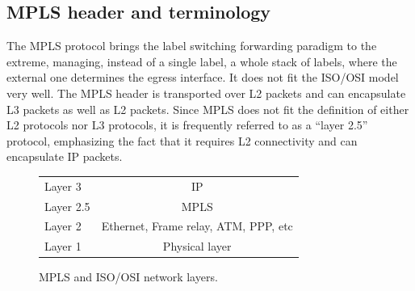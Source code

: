 \documentclass{article}
\begin{document}
% 

%
%
\subsection{MPLS header and terminology}

The MPLS protocol brings the label switching forwarding paradigm to the extreme,
managing, instead of a single label, a whole stack of labels, where the external one
determines the egress interface.
It does not fit the ISO/OSI model very well. The MPLS header is transported 
over L2 packets and can encapsulate L3 packets as well as L2 packets. 
Since MPLS does 
not fit the definition of either L2 protocols nor L3 protocols, it is frequently 
referred to as a ``layer 2.5'' protocol, emphasizing the fact that it requires 
L2 connectivity and can encapsulate IP packets.

\begin{figure}
 \centering
 \begin{tabular}{l |c|}
 \cline{2-2}
  Layer 3 & IP \\ \cline{2-2}
  Layer 2.5 & MPLS \\ \cline{2-2}
  Layer 2 & Ethernet, Frame relay, ATM, PPP, etc \\ \cline{2-2}
  Layer 1 & Physical layer \\ \cline{2-2}	
 \end{tabular}
 \caption{MPLS and ISO/OSI network layers.}
 \label{fig:mpls-iso-osi}
\end{figure}
\end{document}
